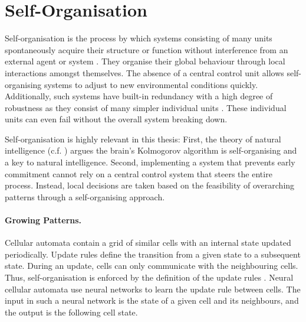 \section{Self-Organisation}
Self-organisation is the process by which systems consisting of many units spontaneously acquire their structure or function without interference from an external agent or system .
They organise their global behaviour through local interactions amongst themselves.
The absence of a central control unit allows self-organising systems to adjust to new environmental conditions quickly.
Additionally, such systems have built-in redundancy with a high degree of robustness as they consist of many simpler individual units .
These individual units can even fail without the overall system breaking down.

Self-organisation is highly relevant in this thesis: First, the theory of natural intelligence (c.f. ) argues the brain's Kolmogorov algorithm is self-organising and a key to natural intelligence. Second, implementing a system that prevents early commitment cannot rely on a central control system that steers the entire process. Instead, local decisions are taken based on the feasibility of overarching patterns through a self-organising approach.

\paragraph{Growing Patterns.} Cellular automata contain a grid of similar cells with an internal state updated periodically.
Update rules define the transition from a given state to a subsequent state.
During an update, cells can only communicate with the neighbouring cells.
Thus, self-organisation is enforced by the definition of the update rules \cite{wolfram_cellular_1984, vichniac_simulating_1984}.
Neural cellular automata  use neural networks to learn the update rule between cells.
The input in such a neural network is the state of a given cell and its neighbours, and the output is the following cell state.

